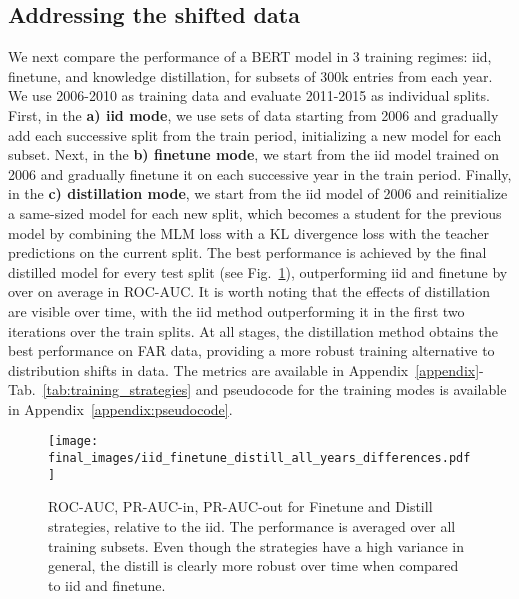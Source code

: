 \documentclass{article}
\begin{document}
\subsection{Addressing the shifted data}\label{sec:ack_shift}
     We next compare the performance of a BERT model in 3 training regimes: iid, finetune, and knowledge distillation, for subsets of 300k entries from each year. We use 2006-2010 as training data and evaluate 2011-2015 as individual splits. First, in the \textbf{a) iid mode}, we use sets of data starting from 2006 and gradually add each successive split from the train period, initializing a new model for each subset. Next, in the \textbf{b) finetune mode}, we start from the iid model trained on 2006 and gradually finetune it on each successive year in the train period. Finally, in the \textbf{c) distillation mode}, we start from the iid model of 2006 and reinitialize a same-sized model for each new split, which becomes a student for the previous model by combining the MLM loss with a KL divergence loss with the teacher predictions on the current split. The best performance is achieved by the final distilled model for every test split (see Fig.~\ref{fig:iid_finetune_distill}), outperforming iid and finetune by over  on average in ROC-AUC. It is worth noting that the effects of distillation are visible over time, with the iid method outperforming it in the first two iterations over the train splits. At all stages, the distillation method obtains the best performance on FAR data, providing a more robust training alternative to distribution shifts in data. The metrics are available in Appendix~\ref{appendix}-Tab.~\ref{tab:training_strategies} and pseudocode for the training modes is available in Appendix~\ref{appendix:pseudocode}.
    
    
    \begin{figure}[t]
        \begin{center}
            \texttt{[image: final\_images/iid\_finetune\_distill\_all\_years\_differences.pdf]}
        \end{center}
        \caption{ROC-AUC, PR-AUC-in, PR-AUC-out for Finetune and Distill strategies, relative to the iid. The performance is averaged over all training subsets. Even though the strategies have a high variance in general, the distill is clearly more robust over time when compared to iid and finetune.}
        \label{fig:iid_finetune_distill}
\end{figure}
    
\end{document}
